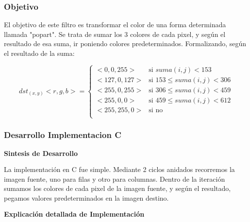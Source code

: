 \vspace*{0.3cm} \noindent
\subsubsection{Objetivo}
El objetivo de este filtro es transformar el color de una forma determinada llamada "popart".\newline
Se trata de sumar los 3 colores de cada pixel, y según el resultado de esa suma, ir poniendo colores predeterminados.
Formalizando, según el resultado de la suma:\newline


\[ dst_{(x,y)} < r, g, b > = \left\{ \begin{array}{ll}
        < 0, 0, 255 > & \mbox{si $suma(i,j) <153 $}\\
       < 127, 0, 127 > & \mbox{si $153 \leq suma(i,j) <306 $}\\
        < 255, 0, 255 > & \mbox{si $306 \leq suma(i,j) <459 $}\\
       < 255, 0, 0 > & \mbox{si $459 \leq suma(i,j) <612 $}\\
        < 255, 255, 0 > & \mbox{si no}\\\end{array} \right. \]

\vspace*{0.3cm} \noindent

\subsubsection{Desarrollo Implementacion C}

\begin{center}
\textbf{Sintesis de Desarrollo} 
\end{center}

La implementación en C fue simple. Mediante 2 ciclos anidados recorremos la imagen fuente, uno para filas y otro para columnas. \newline
Dentro de la iteración sumamos los colores de cada pixel de la imagen fuente, y según el resultado, pegamos valores predeterminados en la imagen destino.\newline


\begin{center}
\textbf{Explicación detallada de Implementación}

\end{center}

